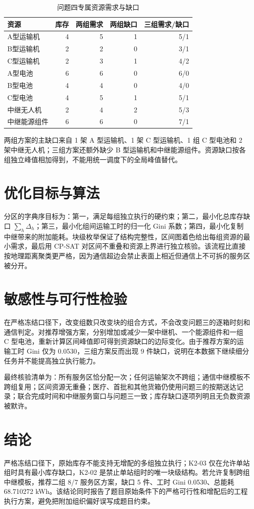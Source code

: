 \documentclass[UTF8,a4paper,12pt]{ctexart}
\begin{document}
\begin{table}[H]\centering\caption{问题四专属资源需求与缺口}\label{tab:q4resource}
\begin{tabular}{lrrrr}\toprule
资源&库存&两组需求&两组缺口&三组需求/缺口\\\midrule
A型运输机&4&5&1&5/1\\
B型运输机&2&2&0&3/1\\
C型运输机&2&3&1&4/2\\
A型电池&6&6&0&6/0\\
B型电池&4&4&0&4/0\\
C型电池&4&5&1&5/1\\
中继无人机&2&4&2&5/3\\
中继能源组件&6&6&0&7/1\\\bottomrule
\end{tabular}\end{table}

两组方案的主缺口来自 1 架 A 型运输机、1 架 C 型运输机、1 组 C 型电池和 2 架中继无人机；三组方案还额外缺少 B 型运输机和中继能源组件。资源缺口按各组独立峰值相加得到，不能用统一调度下的全局峰值替代。
\section{优化目标与算法}
分区的字典序目标为：第一，满足每组独立执行的硬约束；第二，最小化总库存缺口 $\sum_h\Delta_h$；第三，最小化组间运输工时的归一化 Gini 系数；第四，最小化复制中继带来的附加能耗。块级枚举保证了结构完整性，区间图着色给出每组资源的最小需求，最后用 CP-SAT 对区间不重叠和资源上界进行独立核验。该流程比直接按地理距离聚类更严格，因为通信超边会禁止表面上相近但通信上不可拆的服务区被分开。

\section{敏感性与可行性检验}
在严格冻结口径下，改变组数只改变块的组合方式，不会改变问题三的逐箱时刻和通信判定。对推荐增强方案，分别增加或减少一架中继机、一个能源组件和一组 C 型电池，重新计算区间峰值即可得到资源缺口的边际变化。由于推荐方案的运输工时 Gini 仅为 0.0530，三组方案反而出现 9 件缺口，说明在本数据下继续细分任务并不能提高独立执行能力。

最终核验清单为：所有服务区恰分配一次；任何运输架次不跨组；通信中继模板不跨组复用；区间资源无重叠；医疗、首批和其他货箱仍使用问题三的按期送达记录；联合完成时间和中继服务窗口与问题三一致；库存缺口逐项列明且无负数资源被默许。

\section{结论}
严格冻结口径下，原始库存不能支持无增配的多组独立执行；K2-03 仅在允许单站组时具有最小库存缺口，K2-02 是禁止单站组时的唯一块级结构。若允许复制跨组中继模板，推荐二组 8/7 服务区方案，缺口 5 件、工时 Gini 0.0530、总能耗 68.710272 kWh。该结论同时报告了题目原始条件下的严格可行性和增配后的工程执行方案，避免把附加组织偏好误写成题目约束。
\end{document}
